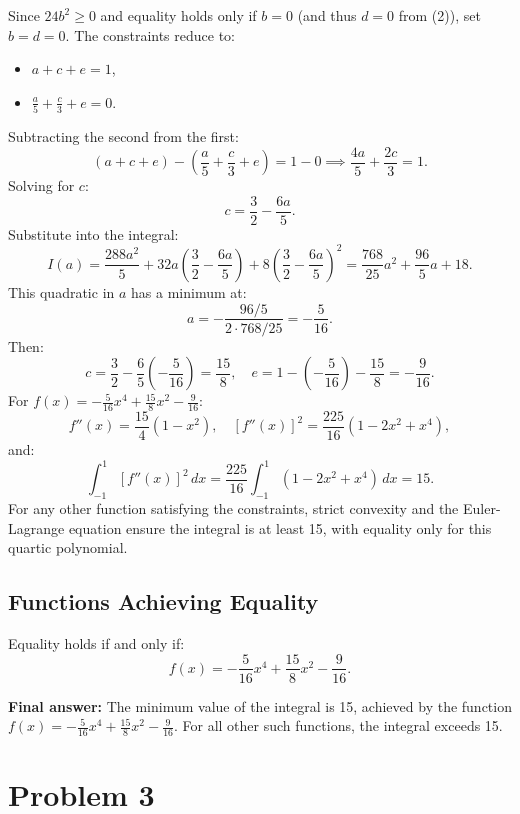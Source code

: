 \documentclass[12pt,a4paper]{article}
\theoremstyle{definition}
\begin{document}
    Since $24b^2 \geq 0$ and equality holds only if $b = 0$ (and thus $d = 0$ from (2)), set $b = d = 0$. The constraints reduce to:
    \begin{itemize}
        \item $a + c + e = 1$,
        \item $\frac{a}{5} + \frac{c}{3} + e = 0$.
    \end{itemize}

    Subtracting the second from the first:
    \[
        (a + c + e) - \left( \frac{a}{5} + \frac{c}{3} + e \right) = 1 - 0 \implies \frac{4a}{5} + \frac{2c}{3} = 1.
    \]
    Solving for $c$:
    \[
        c = \frac{3}{2} - \frac{6a}{5}.
    \]
    Substitute into the integral:
    \[
        I(a) = \frac{288a^2}{5} + 32a \left( \frac{3}{2} - \frac{6a}{5} \right) + 8 \left( \frac{3}{2} - \frac{6a}{5} \right)^2 = \frac{768}{25} a^2 + \frac{96}{5} a + 18.
    \]
    This quadratic in $a$ has a minimum at:
    \[
        a = -\frac{96/5}{2 \cdot 768/25} = -\frac{5}{16}.
    \]
    Then:
    \[
        c = \frac{3}{2} - \frac{6}{5} \left( -\frac{5}{16} \right) = \frac{15}{8}, \quad e = 1 - \left( -\frac{5}{16} \right) - \frac{15}{8} = -\frac{9}{16}.
    \]
    For $f(x) = -\frac{5}{16} x^4 + \frac{15}{8} x^2 - \frac{9}{16}$:
    \[
        f''(x) = \frac{15}{4} (1 - x^2), \quad [f''(x)]^2 = \frac{225}{16} (1 - 2x^2 + x^4),
    \]
    and:
    \[
        \int_{-1}^{1} [f''(x)]^2 \, dx = \frac{225}{16} \int_{-1}^{1} (1 - 2x^2 + x^4) \, dx = 15.
    \]
    For any other function satisfying the constraints, strict convexity and the Euler-Lagrange equation ensure the integral is at least 15, with equality only for this quartic polynomial.

    \subsection*{Functions Achieving Equality}
    Equality holds if and only if:
    \[
        f(x) = -\frac{5}{16} x^4 + \frac{15}{8} x^2 - \frac{9}{16}.
    \]

    \textbf{Final answer:} The minimum value of the integral is 15, achieved by the function $f(x) = -\frac{5}{16} x^4 + \frac{15}{8} x^2 - \frac{9}{16}$. For all other such functions, the integral exceeds 15.


    \section{Problem 3}
\end{document}
